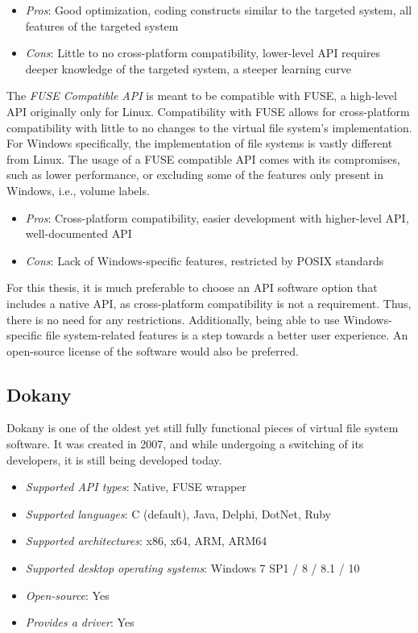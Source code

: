 \begin{itemize}
    \item \textit{Pros}: Good optimization, coding constructs similar to the targeted system, all features of the targeted system
    \item \textit{Cons}: Little to no cross-platform compatibility, lower-level API requires deeper knowledge of the targeted system, a steeper learning curve
\end{itemize}

The \textit{FUSE Compatible API} is meant to be compatible with FUSE, a high-level API originally only for Linux. Compatibility with FUSE allows for cross-platform compatibility with little to no changes to the virtual file system's implementation. For Windows specifically, the implementation of file systems is vastly different from Linux. The usage of a FUSE compatible API comes with its compromises, such as lower performance, or excluding some of the features only present in Windows, i.e., volume labels.\cite{WinFspVSFUSE}\cite{FUSE}

\begin{itemize}
    \item \textit{Pros}: Cross-platform compatibility, easier development with higher-level API, well-documented API
    \item \textit{Cons}: Lack of Windows-specific features, restricted by POSIX standards
\end{itemize}

For this thesis, it is much preferable to choose an API software option that includes a native API, as cross-platform compatibility is not a requirement. Thus, there is no need for any restrictions. Additionally, being able to use Windows-specific file system-related features is a step towards a better user experience. An open-source license of the software would also be preferred.

\subsection{Dokany}
Dokany is one of the oldest yet still fully functional pieces of virtual file system software. It was created in 2007, and while undergoing a switching of its developers, it is still being developed today.

\begin{itemize}
    \item \textit{Supported API types}: Native, FUSE wrapper
    \item \textit{Supported languages}: C (default), Java, Delphi, DotNet, Ruby
    \item \textit{Supported architectures}: x86, x64, ARM, ARM64
    \item \textit{Supported desktop operating systems}: Windows 7 SP1 / 8 / 8.1 / 10
    \item \textit{Open-source}: Yes
    \item \textit{Provides a driver}: Yes
\end{itemize}

